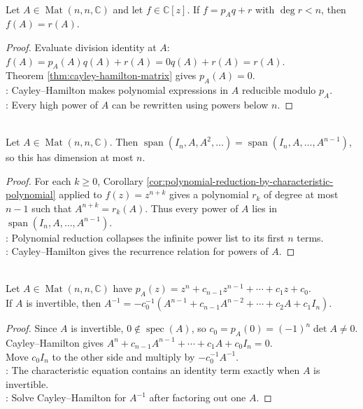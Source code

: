 \begin{corollary} \label{cor:polynomial-reduction-by-characteristic-polynomial} \\
Let $A\in\operatorname{Mat}(n,n,\mathbb{C})$ and let $f\in\mathbb{C}[z]$. If $f=p_Aq+r$ with $\deg r<n$, then $f(A)=r(A)$.
\begin{proof}
Evaluate division identity at $A$: $f(A)=p_A(A)q(A)+r(A)=0q(A)+r(A)=r(A)$.\\
Theorem \ref{thm:cayley-hamilton-matrix} gives $p_A(A)=0$.\\
: Cayley--Hamilton makes polynomial expressions in $A$ reducible modulo $p_A$.\\
: Every high power of $A$ can be rewritten using powers below $n$.
\end{proof}
\end{corollary}

\begin{corollary} \label{cor:powers-of-matrix-span-dimension-at-most-n} \\
Let $A\in\operatorname{Mat}(n,n,\mathbb{C})$. Then $\operatorname{span}(I_n,A,A^2,\ldots)=\operatorname{span}(I_n,A,\ldots,A^{n-1})$, so this has dimension at most $n$.
\begin{proof}
For each $k\geq0$, Corollary \ref{cor:polynomial-reduction-by-characteristic-polynomial} applied to $f(z)=z^{n+k}$ gives a polynomial $r_k$ of degree at most $n-1$ such that $A^{n+k}=r_k(A)$. Thus every power of $A$ lies in $\operatorname{span}(I_n,A,\ldots,A^{n-1})$.\\
: Polynomial reduction collapses the infinite power list to its first $n$ terms.\\
: Cayley--Hamilton gives the recurrence relation for powers of $A$.
\end{proof}
\end{corollary}

\begin{corollary} \label{cor:inverse-from-characteristic-polynomial} \\
Let $A\in\operatorname{Mat}(n,n,\mathbb{C})$ have $p_A(z)=z^n+c_{n-1}z^{n-1}+\cdots+c_1z+c_0$.\\
If $A$ is invertible, then $A^{-1}=-c_0^{-1}(A^{n-1}+c_{n-1}A^{n-2}+\cdots+c_2A+c_1I_n)$.
\begin{proof}
Since $A$ is invertible, $0\notin\operatorname{spec}(A)$, so $c_0=p_A(0)=(-1)^n\det A\neq0$.\\
Cayley--Hamilton gives $A^n+c_{n-1}A^{n-1}+\cdots+c_1A+c_0I_n=0$.\\
Move $c_0I_n$ to the other side and multiply by $-c_0^{-1}A^{-1}$.\\
: The characteristic equation contains an identity term exactly when $A$ is invertible.\\
: Solve Cayley--Hamilton for $A^{-1}$ after factoring out one $A$.
\end{proof}
\end{corollary}

